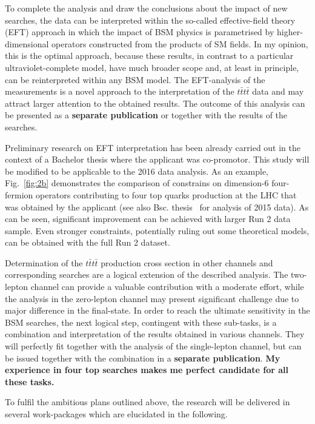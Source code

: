 \textcolor{\mycolor}{
To complete the analysis and draw the conclusions about the impact of new searches, the data can be interpreted within the so-called effective-field theory (EFT) approach in which the impact of BSM physics is parametrised by higher-dimensional operators constructed from the products of SM fields. In my opinion, this is the optimal approach, because these results, in contrast to a particular ultraviolet-complete model, have much broader scope and, at least in principle, can be reinterpreted within any BSM model. The EFT-analysis of the measurements is a novel approach to the interpretation of the $t\bar{t}t\bar{t}$ data and may attract larger attention to the obtained results. The outcome of this analysis can be presented as a \textbf{separate publication} or together with the results of the searches. }

\textcolor{\mycolor}{
Preliminary research on EFT interpretation has been already carried out in the context of a Bachelor thesis where the applicant was co-promotor. This study will be modified to be applicable to the 2016 data analysis. As an example, Fig.~\ref{fig:2b} demonstrates the comparison of constrains on dimension-6 four-fermion operators contributing to four top quarks production at the LHC that was obtained by the applicant (see also Bsc. thesis~\cite{MathiasThesis} for analysis of 2015 data). As can be seen, significant improvement can be achieved with larger Run 2 data sample. Even stronger constraints, potentially ruling out some theoretical models, can be obtained with the full Run 2 dataset.
}

\textcolor{\mycolor}{
Determination of the $t\bar{t}t\bar{t}$ production cross section in other channels and corresponding searches are a logical extension of the described analysis. The two-lepton channel can provide a valuable contribution with a moderate effort, while the analysis in the zero-lepton channel may present significant challenge due to major difference in the final-state. In order to reach the ultimate sensitivity in the BSM searches, the next logical step, contingent with these sub-tasks, is a combination and interpretation of the results obtained in various channels. They will perfectly fit together with the analysis of the single-lepton channel, but can be issued together with the combination in a \textbf{separate publication}. \textbf{My experience in four top searches makes me perfect candidate for all these tasks.}}

\textcolor{\mycolor}{
To fulfil the ambitious plans outlined above, the research will be delivered in several work-packages which are elucidated in the following.}
